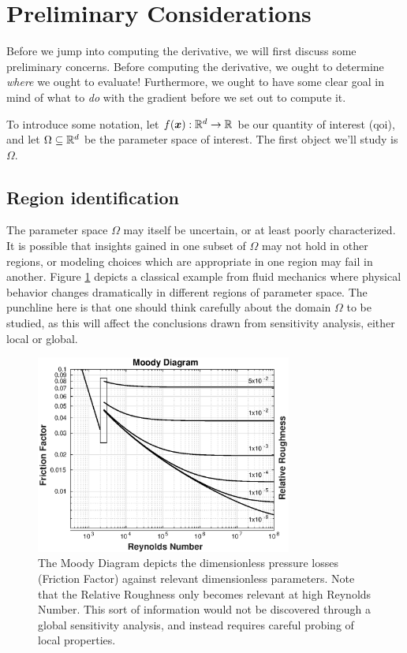 \documentclass[../primer.tex]{subfiles}
\begin{document}
\section{Preliminary Considerations}
\label{sec:org797e9af}
Before we jump into computing the derivative, we will first discuss some
preliminary concerns. Before computing the derivative, we ought to determine
\emph{where} we ought to evaluate! Furthermore, we ought to have some clear goal in
mind of what to \emph{do} with the gradient before we set out to compute it.

To introduce some notation, let \(f(\boldsymbol{x}):\mathbb{R}^{d}\to\mathbb{R}^{}\) be our quantity of
interest (qoi), and let \(\Omega\subseteq\mathbb{R}^{d}\) be the parameter space of
interest. The first object we'll study is \(\Omega\).

\subsection{Region identification}
\label{sec:orgcd17394}
The parameter space \(\Omega\) may itself be uncertain, or at least poorly
characterized. It is possible that insights gained in one subset of \(\Omega\) may
not hold in other regions, or modeling choices which are appropriate in one
region may fail in another. Figure \ref{fig:moody} depicts a classical example
from fluid mechanics where physical behavior changes dramatically in different
regions of parameter space. The punchline here is that one should think
carefully about the domain \(\Omega\) to be studied, as this will affect the
conclusions drawn from sensitivity analysis, either local or global.

\begin{figure}[!ht]
  \centering\includegraphics[width=0.75\textwidth]{./images/moody_diagram}
  \caption{The Moody Diagram depicts the dimensionless pressure losses (Friction Factor)
  against relevant dimensionless parameters. Note that the Relative Roughness only
  becomes relevant at high Reynolds Number. This sort of information would not be
  discovered through a global sensitivity analysis, and instead requires careful
  probing of local properties.}
  \label{fig:moody}
\end{figure}
\end{document}
